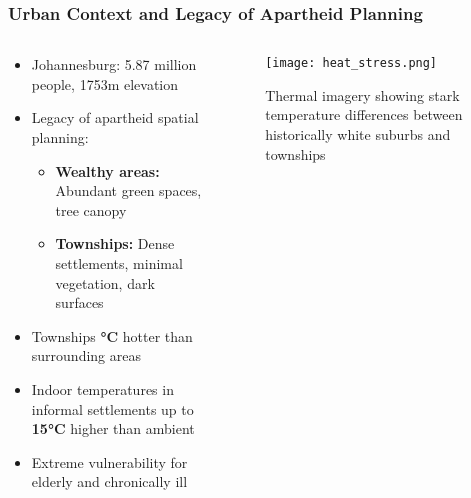 \documentclass[aspectratio=169]{beamer}
\newcommand{\concept}[1]{\textcolor{witsteal}{\textbf{#1}}}
\newcommand{\statistic}[1]{\textcolor{witsaccent}{\textbf{#1}}}
\begin{document}
\begin{frame}
    \frametitle{Urban Context and Legacy of Apartheid Planning}
    
    \begin{columns}[T]
        \begin{column}{0.55\textwidth}
            \begin{itemize}[leftmargin=*, itemsep=8pt]
                \item Johannesburg: 5.87 million people, 1753m elevation
                \item Legacy of apartheid spatial planning:
                \begin{itemize}[itemsep=6pt]
                    \item \concept{Wealthy areas:} Abundant green spaces, tree canopy
                    \item \concept{Townships:} Dense settlements, minimal vegetation, dark surfaces
                \end{itemize}
            \end{itemize}
            
            \begin{tcolorbox}[colback=witsteal!10, colframe=witsteal, title=Temperature Disparities]
                \begin{itemize}[leftmargin=*, itemsep=6pt]
                    \item Townships \statistic{°C} hotter than surrounding areas
                    \item Indoor temperatures in informal settlements up to \statistic{15°C} higher than ambient
                    \item Extreme vulnerability for elderly and chronically ill
                \end{itemize}
            \end{tcolorbox}
        \end{column}
        \begin{column}{0.42\textwidth}
            \begin{figure}
                \texttt{[image: heat\_stress.png]}
                \caption{\small Thermal imagery showing stark temperature differences between historically white suburbs and townships}
            \end{figure}
        \end{column}
    \end{columns}
\end{frame}
\end{document}
